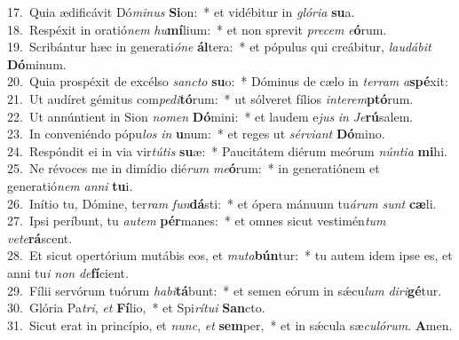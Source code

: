 {17.~}Quia ædificávit Dó\textit{mi}\textit{nus} \textbf{Si}on:~* et vidébitur in \textit{gló}\textit{ri}\textit{a} \textbf{su}a.\\
{18.~}Respéxit in oratió\textit{nem} \textit{hu}\textbf{mí}lium:~* et non sprevit \textit{pre}\textit{cem} \textit{e}\textbf{ó}rum.\\
{19.~}Scribántur hæc in generati\textit{ó}\textit{ne} \textbf{ál}tera:~* et pópulus qui creábitur, \textit{lau}\textit{dá}\textit{bit} \textbf{Dó}minum.\\
{20.~}Quia prospéxit de excélso \textit{san}\textit{cto} \textbf{su}o:~* Dóminus de cælo in \textit{ter}\textit{ram} \textit{a}\textbf{spé}xit:\\
{21.~}Ut audíret gémitus com\textit{pe}\textit{di}\textbf{tó}rum:~* ut sólveret fílios \textit{in}\textit{te}\textit{rem}\textbf{ptó}rum.\\
{22.~}Ut annúntient in Sion \textit{no}\textit{men} \textbf{Dó}mini:~* et laudem e\textit{jus} \textit{in} \textit{Je}\textbf{rú}salem.\\
{23.~}In conveniéndo pópu\textit{los} \textit{in} \textbf{u}num:~* et reges ut \textit{sér}\textit{vi}\textit{ant} \textbf{Dó}mino.\\
{24.~}Respóndit ei in via vir\textit{tú}\textit{tis} \textbf{su}æ:~* Paucitátem diérum meórum \textit{nún}\textit{ti}\textit{a} \textbf{mi}hi.\\
{25.~}Ne révoces me in dimídio dié\textit{rum} \textit{me}\textbf{ó}rum:~* in generatiónem et generatió\textit{nem} \textit{an}\textit{ni} \textbf{tu}i.\\
{26.~}Inítio tu, Dómine, ter\textit{ram} \textit{fun}\textbf{dá}sti:~* et ópera mánuum tu\textit{á}\textit{rum} \textit{sunt} \textbf{cæ}li.\\
{27.~}Ipsi períbunt, tu \textit{au}\textit{tem} \textbf{pér}manes:~* et omnes sicut vestimén\textit{tum} \textit{ve}\textit{te}\textbf{rá}scent.\\
{28.~}Et sicut opertórium mutábis eos, et \textit{mu}\textit{ta}\textbf{bún}tur:~* tu autem idem ipse es, et anni tu\textit{i} \textit{non} \textit{de}\textbf{fí}cient.\\
{29.~}Fílii servórum tuórum \textit{ha}\textit{bi}\textbf{tá}bunt:~* et semen eórum in sǽcu\textit{lum} \textit{di}\textit{ri}\textbf{gé}tur.\\
{30.~}Glória Pa\textit{tri}, \textit{et} \textbf{Fí}lio,~* et Spi\textit{rí}\textit{tu}\textit{i} \textbf{San}cto.\\
{31.~}Sicut erat in princípio, et \textit{nunc}, \textit{et} \textbf{sem}per,~* et in sǽcula sæ\textit{cu}\textit{ló}\textit{rum}. \textbf{A}men.\\
